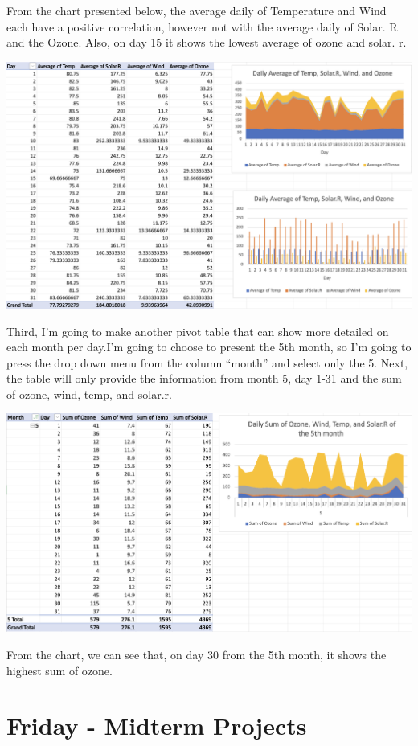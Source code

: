\documentclass[
  letterpaper,
  DIV=11,
  numbers=noendperiod]{scrreprt}
\begin{document}
From the chart presented below, the average daily of Temperature and
Wind each have a positive correlation, however not with the average
daily of Solar. R and the Ozone. Also, on day 15 it shows the lowest
average of ozone and solar. r.

\includegraphics{./pivot2.png}

Third, I'm going to make another pivot table that can show more detailed
on each month per day.I'm going to choose to present the 5th month, so
I'm going to press the drop down menu from the column ``month'' and
select only the 5. Next, the table will only provide the information
from month 5, day 1-31 and the sum of ozone, wind, temp, and solar.r.

\includegraphics{./pivot3.png}

From the chart, we can see that, on day 30 from the 5th month, it shows
the highest sum of ozone.

\section{Friday - Midterm Projects}\label{friday---midterm-projects}
\end{document}
